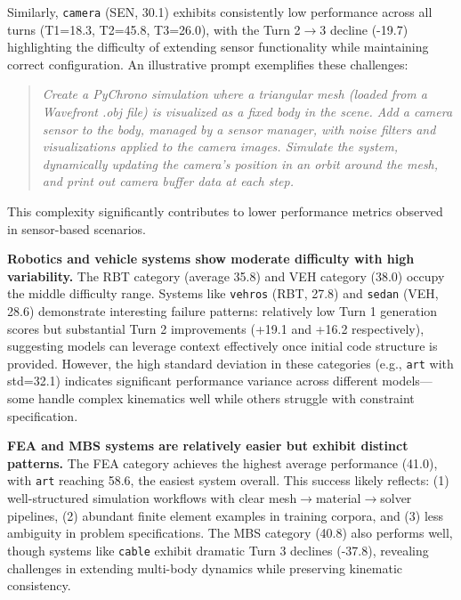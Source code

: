 Similarly, \texttt{camera} (SEN, 30.1) exhibits consistently low performance across all turns (T1=18.3, T2=45.8, T3=26.0), with the Turn 2$\to$3 decline (-19.7)
 highlighting the difficulty of extending sensor functionality while maintaining correct configuration. An illustrative prompt exemplifies these challenges:

\begin{quote}
\textit{Create a PyChrono simulation where a triangular mesh (loaded from a Wavefront .obj file) is visualized as a fixed body in the scene. Add a camera sensor to the body, managed by a sensor manager, with noise filters and visualizations applied to the camera images. Simulate the system, dynamically updating the camera's position in an orbit around the mesh, and print out camera buffer data at each step.}
\end{quote}

This complexity significantly contributes to lower performance metrics observed in sensor-based scenarios.

\medskip

\textbf{Robotics and vehicle systems show moderate difficulty with high variability.}
The RBT category (average 35.8) and VEH category (38.0) occupy the middle difficulty range. Systems like \texttt{vehros} (RBT, 27.8) and \texttt{sedan} (VEH, 28.6) demonstrate interesting failure patterns: relatively low Turn 1 generation scores but substantial Turn 2 improvements (+19.1 and +16.2 respectively), suggesting models can leverage context effectively once initial code structure is provided. However, the high standard deviation in these categories (e.g., \texttt{art} with std=32.1) indicates significant performance variance across different models—some handle complex kinematics well while others struggle with constraint specification.

\textbf{FEA and MBS systems are relatively easier but exhibit distinct patterns.}
The FEA category achieves the highest average performance (41.0), with \texttt{art} reaching 58.6, the easiest system overall. This success likely reflects: (1) well-structured simulation workflows with clear mesh$\to$material$\to$solver pipelines, (2) abundant finite element examples in training corpora, and (3) less ambiguity in problem specifications. The MBS category (40.8) also performs well, though systems like \texttt{cable} exhibit dramatic Turn 3 declines (-37.8), revealing challenges in extending multi-body dynamics while preserving kinematic consistency.

